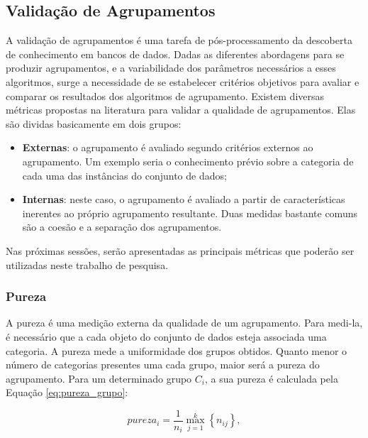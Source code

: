 \subsection{Validação de Agrupamentos}
	\label{subsec:validacao_agrupamentos}
	
A validação de agrupamentos é uma tarefa de pós-processamento da descoberta de
conhecimento em bancos de dados. Dadas as diferentes abordagens para se produzir
agrupamentos, e a variabilidade dos parâmetros necessários a esses algoritmos,
surge a necessidade de se estabelecer critérios objetivos para avaliar e 
comparar os resultados dos algoritmos de agrupamento. Existem diversas métricas
propostas na literatura para validar a qualidade de agrupamentos. Elas são 
dividas basicamente em dois grupos:

\begin{itemize}
	\item \textbf{Externas}: o agrupamento é avaliado segundo critérios externos
	ao agrupamento. Um exemplo seria o conhecimento prévio sobre a categoria de
	cada uma das instâncias do conjunto de dados;
	
	\item \textbf{Internas}: neste caso, o agrupamento é avaliado a partir de 
	características inerentes ao próprio agrupamento resultante. Duas medidas 
	bastante comuns são a coesão e a separação dos agrupamentos. 
\end{itemize}

Nas próximas sessões, serão apresentadas as principais métricas que poderão
ser utilizadas neste trabalho de pesquisa.

\subsubsection{Pureza}
	\label{subsubsec:pureza}

A pureza é uma medição externa da qualidade de um agrupamento. Para medi-la, é
necessário que a cada objeto do conjunto de dados esteja associada uma
categoria. A pureza mede a uniformidade dos grupos obtidos. Quanto menor o
número de categorias presentes uma cada grupo, maior será a pureza do
agrupamento. Para um determinado grupo $C_i$, a sua pureza é calculada pela
Equação \ref{eq:pureza_grupo}:

\begin{equation}
	pureza_i = \frac{1}{n_i} \max_{j = 1}^{k}{\left\{n_{ij}\right\}},
	\label{eq:pureza_grupo}
\end{equation}

